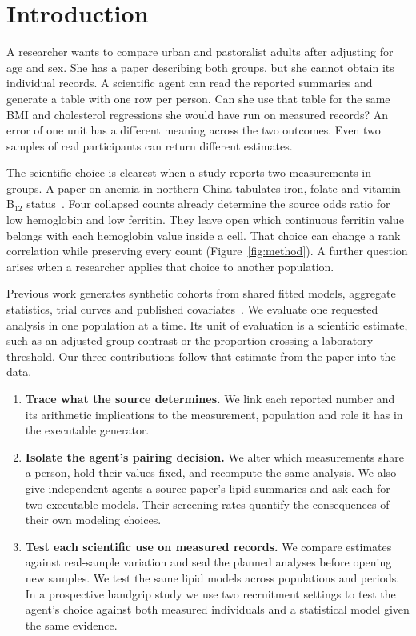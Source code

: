 \documentclass[sigconf,anonymous,review]{acmart}
\begin{document}
\section{Introduction}
A researcher wants to compare urban and pastoralist adults after adjusting for age and sex. She has a paper describing both groups, but she cannot obtain its individual records. A scientific agent can read the reported summaries and generate a table with one row per person. Can she use that table for the same BMI and cholesterol regressions she would have run on measured records? An error of one unit has a different meaning across the two outcomes. Even two samples of real participants can return different estimates.

The scientific choice is clearest when a study reports two measurements in groups. A paper on anemia in northern China tabulates iron, folate and vitamin B$_{12}$ status~\cite{zhu}. Four collapsed counts already determine the source odds ratio for low hemoglobin and low ferritin. They leave open which continuous ferritin value belongs with each hemoglobin value inside a cell. That choice can change a rank correlation while preserving every count (Figure~\ref{fig:method}). A further question arises when a researcher applies that choice to another population.

Previous work generates synthetic cohorts from shared fitted models, aggregate statistics, trial curves and published covariates~\cite{filshtein,llmsynthor,synthipd,kmgen}. We evaluate one requested analysis in one population at a time. Its unit of evaluation is a scientific estimate, such as an adjusted group contrast or the proportion crossing a laboratory threshold. Our three contributions follow that estimate from the paper into the data.
\begin{enumerate}
\item \textbf{Trace what the source determines.} We link each reported number and its arithmetic implications to the measurement, population and role it has in the executable generator.
\item \textbf{Isolate the agent's pairing decision.} We alter which measurements share a person, hold their values fixed, and recompute the same analysis. We also give independent agents a source paper's lipid summaries and ask each for two executable models. Their screening rates quantify the consequences of their own modeling choices.
\item \textbf{Test each scientific use on measured records.} We compare estimates against real-sample variation and seal the planned analyses before opening new samples. We test the same lipid models across populations and periods. In a prospective handgrip study we use two recruitment settings to test the agent's choice against both measured individuals and a statistical model given the same evidence.
\end{enumerate}
\end{document}
